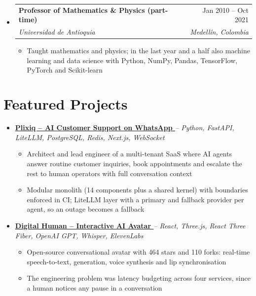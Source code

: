 \documentclass[letterpaper,10pt]{article}
\makeatletter
\newcommand{\resumeSubheading}[4]{
  \vspace{-2pt}
  \item[]
  \begin{tabular*}{\textwidth}{@{\extracolsep{\fill}}l r}
    \textbf{#1} & #2 \\
    \textit{#3} & \textit{#4} \\
  \end{tabular*}
  \vspace{-5pt}
}
\newcommand{\normalfaExternalLink}{{\mdseries\faExternalLink}}
\makeatother
\begin{document}
\begin{itemize}[leftmargin=0pt, itemindent=0pt, label={}, itemsep=1pt]
\begin{itemize}[leftmargin=*, itemsep=0pt]
    \item Designed blockchain products from scratch and built them with Python (Django), Node.js, React and Web3.js on AWS, GCP and IBM Cloud; mentored new developers and reviewed the team's code
\end{itemize}
\resumeSubheading
{Professor of Mathematics \& Physics (part-time)}{Jan 2010 -- Oct 2021}
{Universidad de Antioquia}{Medell\'in, Colombia}
\begin{itemize}[leftmargin=*, itemsep=0pt]
    \item Taught mathematics and physics; in the last year and a half also machine learning and data science with Python, NumPy, Pandas, TensorFlow, PyTorch and Scikit-learn
\end{itemize}
\end{itemize}

\section{Featured Projects}
\begin{itemize}[leftmargin=*, itemsep=2pt]
    \item \textbf{\href{https://plixiq.com}{Plixiq -- AI Customer Support on WhatsApp \normalfaExternalLink}} \textit{-- Python, FastAPI, LiteLLM, PostgreSQL, Redis, Next.js, WebSocket}
    \begin{itemize}[itemsep=0pt]
        \item Architect and lead engineer of a multi-tenant SaaS where AI agents answer routine customer inquiries, book appointments and escalate the rest to human operators with full conversation context
        \item Modular monolith (14 components plus a shared kernel) with boundaries enforced in CI; LiteLLM layer with a primary and fallback provider per agent, so an outage becomes a fallback
    \end{itemize}
    \item \textbf{\href{https://github.com/asanchezyali/talking-avatar-with-ai}{Digital Human -- Interactive AI Avatar \normalfaExternalLink}} \textit{-- React, Three.js, React Three Fiber, OpenAI GPT, Whisper, ElevenLabs}
    \begin{itemize}[itemsep=0pt]
        \item Open-source conversational avatar with 464 stars and 110 forks: real-time speech-to-text, generation, voice synthesis and lip synchronisation
        \item The engineering problem was latency budgeting across four services, since a human notices any pause in a conversation
    \end{itemize}
\end{itemize}
\end{document}
